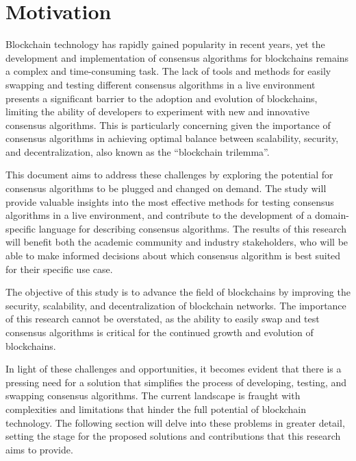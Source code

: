 \section{Motivation}


Blockchain technology has rapidly gained popularity in recent years, yet the development and implementation of consensus algorithms for blockchains remains a complex and time-consuming task. The lack of tools and methods for easily swapping and testing different consensus algorithms in a live environment presents a significant barrier to the adoption and evolution of blockchains, limiting the ability of developers to experiment with new and innovative consensus algorithms. This is particularly concerning given the importance of consensus algorithms in achieving optimal balance between scalability, security, and decentralization, also known as the ``blockchain trilemma''.

This document aims to address these challenges by exploring the potential for consensus algorithms to be plugged and changed on demand. The study will provide valuable insights into the most effective methods for testing consensus algorithms in a live environment, and contribute to the development of a domain-specific language for describing consensus algorithms. The results of this research will benefit both the academic community and industry stakeholders, who will be able to make informed decisions about which consensus algorithm is best suited for their specific use case.

The objective of this study is to advance the field of blockchains by improving the security, scalability, and decentralization of blockchain networks. The importance of this research cannot be overstated, as the ability to easily swap and test consensus algorithms is critical for the continued growth and evolution of blockchains.

In light of these challenges and opportunities, it becomes evident that there is a pressing need for a solution that simplifies the process of developing, testing, and swapping consensus algorithms. The current landscape is fraught with complexities and limitations that hinder the full potential of blockchain technology. The following section will delve into these problems in greater detail, setting the stage for the proposed solutions and contributions that this research aims to provide.

